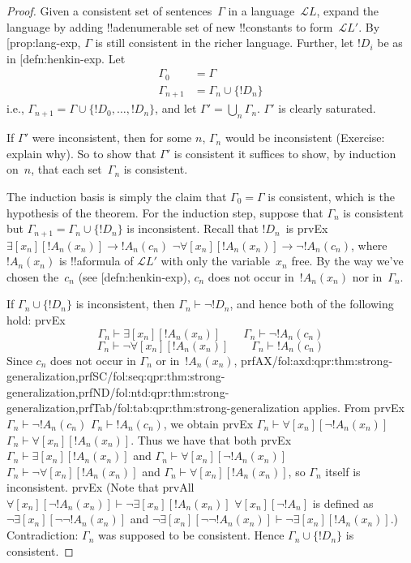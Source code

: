 \documentclass[10pt,a4paper]{article}
\makeatletter
\theoremstyle{plain}
\theoremstyle{definition}
\theoremstyle{remark}
\newcommand{\olref}{\@ifnextchar[{\olref@i}{\olref@final}}
\def\olref@i[#1]{\@ifnextchar[{\olref@ii}{\olref@final}}
\def\olref@ii[#1]{\@ifnextchar[{\olref@iii}{\olref@final}}
\def\olref@iii[#1]{\olref@final}
\def\olref@final#1{\ref{#1}}
\providecommand{\lif}{\mathbin{\rightarrow}}
\providecommand{\lforall}{\mathord{\forall}}
\providecommand{\lexists}{\mathord{\exists}}
\providecommand{\Proves}{\mathrel{\vdash}}
\providecommand{\Lang}{\ensuremath{\mathcal{L}}}
\providecommand{\iftag}[1]{#1}
\providecommand{\tagrefs}[1]{#1}
\makeatother
\begin{document}
\begin{proof}
Given a consistent set of sentences~$\Gamma$ in a language~$\Lang{L}$,
expand the language by adding !!a{denumerable} set of new
!!{constant}s to form~$\Lang{L'}$.  By \olref{prop:lang-exp}, $\Gamma$
is still consistent in the richer language.  Further, let $!D_i$ be as
in \olref{defn:henkin-exp}.  Let
\begin{align*}
\Gamma_0 & = \Gamma \\
\Gamma_{n+1} & = \Gamma_n \cup \{!D_n \}
\end{align*}
i.e., $\Gamma_{n+1} = \Gamma \cup \{ !D_0, \dots, !D_n \}$, and let
$\Gamma' = \bigcup_{n} \Gamma_n$.  $\Gamma'$ is clearly saturated.

If $\Gamma'$ were inconsistent, then for some $n$, $\Gamma_n$ would be
inconsistent (Exercise: explain why).  So to show that $\Gamma'$ is
consistent it suffices to show, by induction on~$n$, that each
set~$\Gamma_n$ is consistent.

The induction basis is simply the claim that $\Gamma_0 = \Gamma$ is
consistent, which is the hypothesis of the theorem.  For the induction
step, suppose that $\Gamma_{n}$ is consistent but $\Gamma_{n+1} =
\Gamma_n \cup \{!D_n\}$ is inconsistent.  Recall that $!D_n$~is
\iftag{prvEx}
{$\lexists[x_{n}][!A_{n}(x_n)] \lif !A_{n}(c_{n})$}
{$\lnot\lforall[x_{n}][!A_{n}(x_n)] \lif \lnot !A_{n}(c_{n})$},
where $!A_n(x_n)$ is !!a{formula} of $\Lang{L'}$ with only the
variable~$x_n$ free. By the way we've chosen the~$c_n$ (see
\olref{defn:henkin-exp}), $c_n$ does not occur in~$!A_n(x_n)$ nor
in~$\Gamma_n$.

If $\Gamma_n \cup \{!D_n\}$ is inconsistent, then $\Gamma_n
\Proves \lnot !D_n$, and hence both of the following hold:
\iftag{prvEx}{
\[
\Gamma_n \Proves \lexists[x_n][!A_n(x_n)]
\qquad
\Gamma_n \Proves \lnot !A_n(c_n)
\]}{
\[
\Gamma_n \Proves \lnot\lforall[x_n][!A_n(x_n)]
\qquad
\Gamma_n \Proves !A_n(c_n)
\]}
Since $c_n$ does not occur in
$\Gamma_n$ or in~$!A_n(x_n)$, 
\tagrefs{prfAX/{fol:axd:qpr:thm:strong-generalization},prfSC/{fol:seq:qpr:thm:strong-generalization},prfND/{fol:ntd:qpr:thm:strong-generalization},prfTab/{fol:tab:qpr:thm:strong-generalization}} applies.
From \iftag{prvEx}
{$\Gamma_n \Proves \lnot !A_n(c_n)$}
{$\Gamma_n \Proves !A_n(c_n)$},
we obtain
\iftag{prvEx}
{$\Gamma_n \Proves \lforall[x_n][\lnot !A_n(x_n)]$}
{$\Gamma_n \Proves \lforall[x_n][!A_n(x_n)]$}.
Thus we have that both
\iftag{prvEx}
{$\Gamma_n \Proves \lexists[x_n][!A_n(x_n)]$ and
$\Gamma_n \Proves \lforall[x_n][\lnot !A_n(x_n)]$}
{$\Gamma_n \Proves \lnot\lforall[x_n][!A_n(x_n)]$ and
$\Gamma_n \Proves \lforall[x_n][!A_n(x_n)]$},
so $\Gamma_n$ itself is inconsistent.
\iftag{prvEx}
{(Note that
\iftag{prvAll}
{$\lforall[x_n][\lnot !A_n(x_n)] \Proves
  \lnot\lexists[x_n][!A_n(x_n)]$}
{$\lforall[x_n][\lnot !A_n]$ is defined as
  $\lnot\lexists[x_n][\lnot\lnot !A_n(x_n)]$ and
  $\lnot\lexists[x_n][\lnot\lnot !A_n(x_n)] \Proves
  \lnot\lexists[x_n][!A_n(x_n)]$}.)}{}
Contradiction: $\Gamma_n$ was supposed to be consistent.  Hence
$\Gamma_n \cup \{ !D_n\}$ is consistent.
\end{proof}
\end{document}
